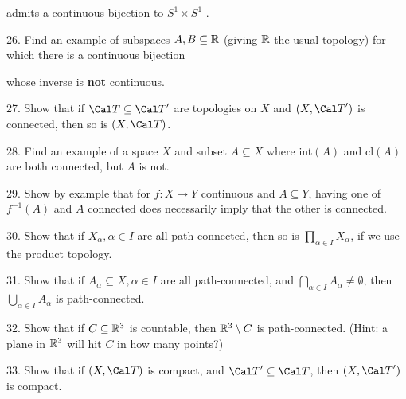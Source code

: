 \item{} admits a continuous bijection to $S^1\times S^1$ .

\ssk

\item{26.} Find an example of subspaces $A,B\subseteq {\Bbb R}$ (giving ${\Bbb R}$ the usual 
topology) for which there is a continuous bijection

\ssk


\ssk

\item{} whose inverse is {\bf not} continuous.

\ssk
\item{27.} Show that if ${\Cal T}\subseteq {\Cal T}^\prime$ are topologies on
$X$ and $(X,{\Cal T}^\prime)$ is connected, then so is $(X,{\Cal T})$.

\ssk

\item{28.} Find an example of a space $X$ and subset $A\subseteq X$ where 
int$(A)$ and cl$(A)$ are both connected, but $A$ is not.

\ssk

\item{29.} Show by example that for $f : X \rightarrow Y$ continuous and $A\subseteq Y$, 
having one of  $f^{-1}(A)$ and $A$  connected does  necessarily imply that the 
other is connected.

\ssk
\item{30.} Show that if $X_\alpha, \alpha\in I$ are all path-connected, then so is
$\displaystyle \prod_{\alpha\in I} X_\alpha$, if we use the product topology.

\ssk

\item{31.} Show that if $A_\alpha\subseteq X, \alpha\in I$ are all path-connected, and
$\displaystyle\bigcap_{\alpha\in I}A_\alpha\neq\emptyset$, then 
$\displaystyle\bigcup_{\alpha\in I}A_\alpha$ is path-connected.

\ssk

\item{32.} Show that if $C\subseteq{\Bbb R}^3$ is countable, then ${\Bbb R}^3\setminus C$
is path-connected. (Hint: a plane in ${\Bbb R}^3$ will hit $C$ in how many points?)

\ssk

\item{33.} Show that if $(X,{\Cal T})$ is compact, and ${\Cal T}^\prime\sset{\Cal T}$, then
$(X,{\Cal T}^\prime)$ is compact.

